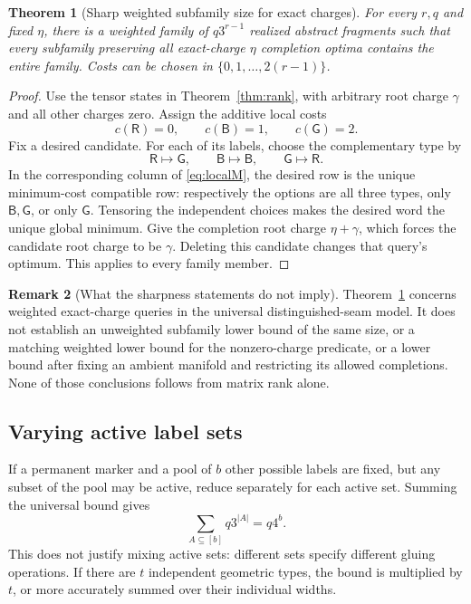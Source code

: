 \documentclass[11pt,letterpaper]{article}
\newtheorem{theorem}{Theorem}[section]
\theoremstyle{definition}
\newtheorem{remark}[theorem]{Remark}
\begin{document}
\begin{theorem}[Sharp weighted subfamily size for exact charges]\label{thm:weightedsharp}
For every $r,q$ and fixed $\eta$, there is a weighted family of $q3^{r-1}$ realized abstract fragments such that every subfamily preserving all exact-charge $\eta$ completion optima contains the entire family. Costs can be chosen in $\{0,1,\ldots,2(r-1)\}$.
\end{theorem}
\begin{proof}
Use the tensor states in Theorem~\ref{thm:rank}, with arbitrary root charge $\gamma$ and all other charges zero. Assign the additive local costs
\[
 c(\mathsf R)=0,\qquad c(\mathsf B)=1,\qquad c(\mathsf G)=2.
\]
Fix a desired candidate. For each of its labels, choose the complementary type by
\[
 \mathsf R\mapsto\mathsf G,\qquad
 \mathsf B\mapsto\mathsf B,\qquad
 \mathsf G\mapsto\mathsf R.
\]
In the corresponding column of \eqref{eq:localM}, the desired row is the unique minimum-cost compatible row: respectively the options are all three types, only $\mathsf B,\mathsf G$, or only $\mathsf G$. Tensoring the independent choices makes the desired word the unique global minimum. Give the completion root charge $\eta+\gamma$, which forces the candidate root charge to be $\gamma$. Deleting this candidate changes that query's optimum. This applies to every family member.
\end{proof}

\begin{remark}[What the sharpness statements do not imply]
Theorem~\ref{thm:weightedsharp} concerns weighted exact-charge queries in the universal distinguished-seam model. It does not establish an unweighted subfamily lower bound of the same size, or a matching weighted lower bound for the nonzero-charge predicate, or a lower bound after fixing an ambient manifold and restricting its allowed completions. None of those conclusions follows from matrix rank alone.
\end{remark}

\subsection{Varying active label sets}
If a permanent marker and a pool of $b$ other possible labels are fixed, but any subset of the pool may be active, reduce separately for each active set. Summing the universal bound gives
\begin{equation}
 \sum_{A\subseteq[b]}q3^{|A|}=q4^b.\label{eq:active}
\end{equation}
This does not justify mixing active sets: different sets specify different gluing operations. If there are $t$ independent geometric types, the bound is multiplied by $t$, or more accurately summed over their individual widths.
\end{document}
